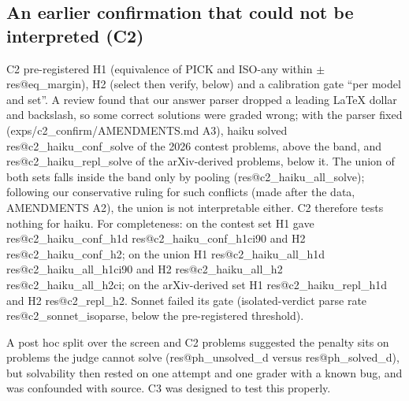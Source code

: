 \documentclass[10pt,twocolumn]{article}
\makeatletter
\newcommand{\res}[1]{\csname res@#1\endcsname}
\makeatother
\begin{document}
\subsection{An earlier confirmation that could not be interpreted (C2)}\label{sec:c2}
C2 pre-registered H1 (equivalence of PICK and ISO-any within $\pm$\res{eq_margin}), H2 (select then verify, below) and a calibration gate ``per model and set''. A review found that our answer parser dropped a leading LaTeX dollar and backslash, so some correct solutions were graded wrong; with the parser fixed (exps/c2\_confirm/AMENDMENTS.md A3), haiku solved \res{c2_haiku_conf_solve} of the 2026 contest problems, above the band, and \res{c2_haiku_repl_solve} of the arXiv-derived problems, below it. The union of both sets falls inside the band only by pooling (\res{c2_haiku_all_solve}); following our conservative ruling for such conflicts (made after the data, AMENDMENTS A2), the union is not interpretable either. C2 therefore tests nothing for haiku. For completeness: on the contest set H1 gave \res{c2_haiku_conf_h1d} \res{c2_haiku_conf_h1ci90} and H2 \res{c2_haiku_conf_h2}; on the union H1 \res{c2_haiku_all_h1d} \res{c2_haiku_all_h1ci90} and H2 \res{c2_haiku_all_h2} \res{c2_haiku_all_h2ci}; on the arXiv-derived set H1 \res{c2_haiku_repl_h1d} and H2 \res{c2_repl_h2}. Sonnet failed its gate (isolated-verdict parse rate \res{c2_sonnet_isoparse}, below the pre-registered threshold).

A post hoc split over the screen and C2 problems suggested the penalty sits on problems the judge cannot solve (\res{ph_unsolved_d} versus \res{ph_solved_d}), but solvability then rested on one attempt and one grader with a known bug, and was confounded with source. C3 was designed to test this properly.
\end{document}
